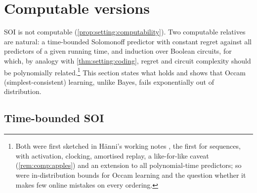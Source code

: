 \section{Computable versions}\label{sec:comp}

SOI is not computable (\cref{prop:setting:computability}). Two computable relatives are natural: a time-bounded Solomonoff predictor with constant regret against all predictors of a given running time, and induction over Boolean circuits, for which, by analogy with \cref{thm:setting:coding}, regret and circuit complexity should be polynomially related.\footnote{Both were first sketched in H\"anni's working notes \citep{hanni2026notes}, the first for sequences, with activation, clocking, amortised replay, a like-for-like caveat (\cref{rem:comp:apples}) and an extension to all polynomial-time predictors; so were in-distribution bounds for Occam learning and the question whether it makes few online mistakes on every ordering.} This section states what holds and shows that Occam (simplest-consistent) learning, unlike Bayes, fails exponentially out of distribution.

\subsection{Time-bounded SOI}\label{sec:comp:time}

